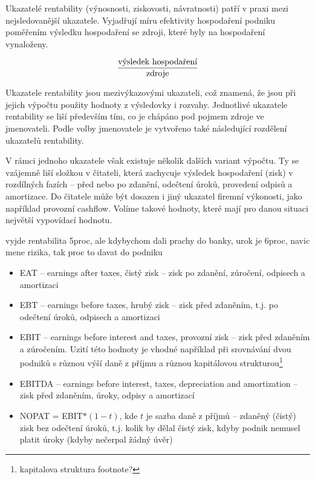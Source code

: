 Ukazatelé rentability (výnosnosti, ziskovosti, návratnosti) patří v praxi mezi nejsledovanější ukazatele. Vyjadřují míru efektivity hospodaření podniku poměřením výsledku hospodaření se zdroji, které byly na hospodaření vynaloženy.

$$\dfrac{\text{výsledek hospodaření}}{\text{zdroje}}$$

Ukazatele rentability jsou mezivýkazovými ukazateli, což znamená, že jsou při jejich výpočtu použity hodnoty z výsledovky i rozvahy. Jednotlivé ukazatele rentability se liší především tím, co je chápáno pod pojmem zdroje ve jmenovateli\cite{mendelu}. Podle volby jmenovatele je vytvořeno také následující rozdělení ukazatelů rentability. 

V rámci jednoho ukazatele však existuje několik dalších variant výpočtu. Ty se vzájemně liší složkou v čitateli, která zachycuje výsledek hospodaření (zisk) v rozdílných fazích -- před nebo po zdanění, odečtení úroků, provedení odpisů a amortizace. Do čitatele může být dosazen i jiný ukazatel firemní výkonosti, jako například provozní cashflow. Volíme takové hodnoty, které mají pro danou situaci největší vypovídací hodnotu.

vyjde rentabilita 5proc, ale kdybychom dali prachy do banky, urok je 6proc, navic mene rizika, tak proc to davat do podniku

\begin{itemize}
\item EAT -- earnings after taxes, čistý zisk -- zisk po zdanění, zúročení, odpisech a amortizaci

\item EBT -- earnings before taxes, hrubý zisk -- zisk před zdaněním, t.j. po odečtení úroků, odpisech a amortizaci

\item EBIT -- earnings before interest and taxes, provozní zisk -- zisk před zdaněním a zúročením. Uzití této hodnoty je vhodné například při srovnávání dvou podniků s různou výší daně z příjmu a různou kapitálovou strukturou\footnote{kapitalova struktura footnote?}

\item EBITDA -- earnings before interest, taxes, depreciation and amortization -- zisk před zdaněním, úroky, odpisy a amortizací

\item NOPAT = EBIT$*(1-t)$, kde $t$ je sazba daně z příjmů  -- zdaněný (čistý) zisk bez odečtení úroků, t.j. kolik by dělal čistý zisk, kdyby podnik nemusel platit úroky (kdyby nečerpal žádný úvěr)
\end{itemize}

